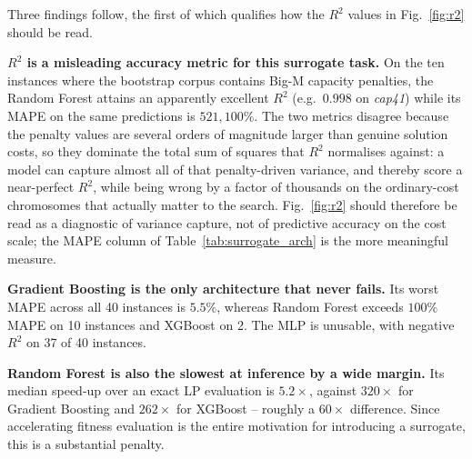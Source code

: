 \documentclass[conference]{IEEEtran}
\begin{document}
\begin{table}[t]
\centering
\caption{Surrogate architecture comparison across all 40 instances, trained on identical per-instance bootstrap corpora. ``Fails'' counts instances whose MAPE exceeds $100\%$. Speed-up is relative to an exact LP evaluation.}
\label{tab:surrogate_arch}
\end{table}

Three findings follow, the first of which qualifies how the $R^2$ values in
Fig.~\ref{fig:r2} should be read.

\textbf{$R^2$ is a misleading accuracy metric for this surrogate task.} On the
ten instances where the bootstrap corpus contains Big-M capacity penalties,
the Random Forest attains an apparently excellent $R^2$ (e.g.\ $0.998$ on
\emph{cap41}) while its MAPE on the same predictions is $521{,}100\%$. The two
metrics disagree because the penalty values are several orders of magnitude
larger than genuine solution costs, so they dominate the total sum of squares
that $R^2$ normalises against: a model can capture almost all of that
penalty-driven variance, and thereby score a near-perfect $R^2$, while being
wrong by a factor of thousands on the ordinary-cost chromosomes that actually
matter to the search. Fig.~\ref{fig:r2} should therefore be read as a
diagnostic of variance capture, not of predictive accuracy on the cost scale;
the MAPE column of Table~\ref{tab:surrogate_arch} is the more meaningful
measure.

\textbf{Gradient Boosting is the only architecture that never fails.} Its
worst MAPE across all 40 instances is $5.5\%$, whereas Random Forest exceeds
$100\%$ MAPE on 10 instances and XGBoost on 2. The MLP is unusable, with
negative $R^2$ on 37 of 40 instances.

\textbf{Random Forest is also the slowest at inference by a wide margin.} Its
median speed-up over an exact LP evaluation is $5.2\times$, against
$320\times$ for Gradient Boosting and $262\times$ for XGBoost -- roughly a
$60\times$ difference. Since accelerating fitness evaluation is the entire
motivation for introducing a surrogate, this is a substantial penalty.
\end{document}
